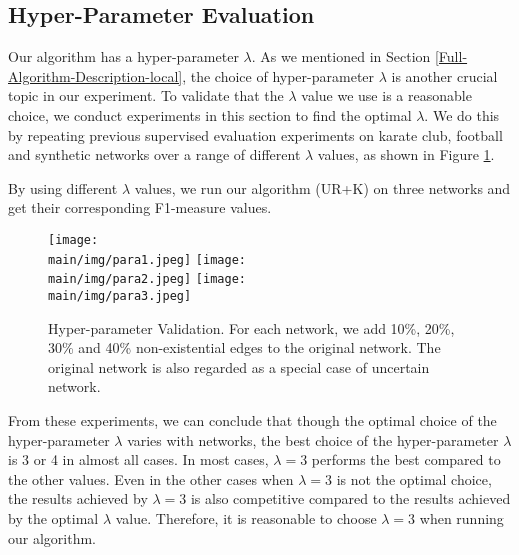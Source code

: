 \documentclass[\main/thesis.tex]{subfiles}
\begin{document}
\subsection{Hyper-Parameter Evaluation} \label{Hyper-Parameter-Evaluation-Local}
Our algorithm has a hyper-parameter $\lambda$. As we mentioned in Section \ref{Full-Algorithm-Description-local}, the choice of hyper-parameter $\lambda$ is another crucial topic in our experiment. To validate that the $\lambda$ value we use is a reasonable choice, we conduct experiments in this section to find the optimal $\lambda$. We do this by repeating previous supervised evaluation experiments on karate club, football and synthetic networks over a range of different $\lambda$ values, as shown in Figure \ref{Hyper-Parameter-Evaluation-local-graph}. 

By using different $\lambda$ values, we run our algorithm (UR+K) on three networks and get their corresponding F1-measure values. 

\begin{figure}
\texttt{[image: \\main/img/para1.jpeg]}
\texttt{[image: \\main/img/para2.jpeg]}
\centering
\texttt{[image: \\main/img/para3.jpeg]}
\caption{Hyper-parameter Validation. For each network, we add 10\%, 20\%, 30\% and 40\% non-existential edges to the original network. The original network is also regarded as a special case of uncertain network.}
\label{Hyper-Parameter-Evaluation-local-graph}
\end{figure}

From these experiments, we can conclude that though the optimal choice of the hyper-parameter $\lambda$ varies with networks, the best choice of the hyper-parameter $\lambda$ is 3 or 4 in almost all cases. In most cases, $\lambda=3$ performs the best compared to the other values. Even in the other cases when $\lambda=3$ is not the optimal choice, the results achieved by $\lambda=3$ is also competitive compared to the results achieved by the optimal $\lambda$ value. Therefore, it is reasonable to choose $\lambda=3$ when running our algorithm.
\end{document}
